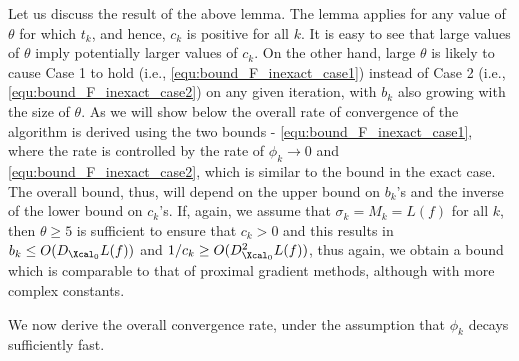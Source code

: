 \documentclass[11pt]{article}
\numberwithin{equation}{section}
\begin{document}
\begin{remark} Let us discuss the result of the above lemma. The lemma applies for any value of $\theta$ for which
$t_k$, and hence, $c_k$ is positive for all $k$.  It is easy to see that large values of  $\theta$ 
imply potentially larger values of $c_k$. On the other hand, large $\theta$ is likely to cause  Case 1 to hold (i.e., \eqref{equ:bound_F_inexact_case1}) 
instead of Case 2 (i.e., \eqref{equ:bound_F_inexact_case2}) on any given iteration, with $b_k$ also growing with the size of $\theta$. 
As we will show below the overall rate of convergence of the algorithm is derived using the two bounds - \eqref{equ:bound_F_inexact_case1}, where
the rate is controlled by the rate of $\phi_k\to 0$ and \eqref{equ:bound_F_inexact_case2}, which is similar to the bound in the exact case.
The overall bound, thus, will depend on the upper bound on $b_k$'s and the inverse of 
the lower bound on $c_k$'s. If, again, we assume that $\sigma_k=M_k=L(f)$ for all $k$, then $\theta\geq 5$ is sufficient to ensure that $c_k>0$
and this results in $b_k\leq O(D_{\Xcal_0}L(f))$ and $1/c_k\geq O(D_{\Xcal_0}^2L(f))$, thus again, we obtain a bound which is comparable to that of proximal gradient methods, although with more complex constants. 
\end{remark}

We now derive the overall convergence rate, under the assumption that $\phi_{k}$ decays sufficiently fast. 
\end{document}

